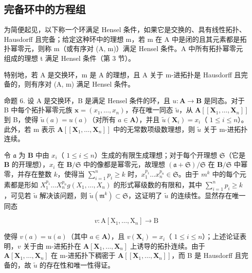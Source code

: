 \subsection{完备环中的方程组}

为简便起见，以下称一个环满足 Hensel 条件，如果它是交换的、具有线性拓扑、Hausdorff 且完备；给定这种环中的理想 m，若 m 在 A 中是闭的且其元素都是拓扑幂零元，则称 m（或有序对 (A, m)）满足 Hensel 条件。A 中所有拓扑幂零元组成的理想 t 满足 Hensel 条件（第 3 节）。

特别地，若 A 是交换环，m 是 A 的理想，且 A 关于 m-进拓扑是 Hausdorff 且完备的，则有序对 (A, m) 满足 Hensel 条件。

命题 6. 设 A 是交换环，B 是满足 Hensel 条件的环，且 \(u: \mathbf{A} \to \mathbf{B}\) 是同态。对于 B 中每个拓扑幂零元族 \(\mathbf{x} = (x_1, \ldots, x_n)\)，存在唯一同态 \(\tilde{u}\)，从 \(\mathbf{A}[[\mathbf{X}_1, \ldots, \mathbf{X}_n]]\) 到 B，使得 \(\tilde{u}(a) = u(a)\)（对所有 \(a \in \mathbf{A}\)），并且 \(\tilde{u}(\mathbf{X}_i) = x_i\)（ \(1 \leqslant i \leqslant n\)）。此外，若 m 表示 \(\mathbf{A}[[\mathbf{X}_1, \ldots, \mathbf{X}_n]]\) 中的无常数项级数理想，则 \(\tilde{u}\) 关于 m-进拓扑连续。

令 \(\mathfrak{a}\) 为 \(\mathbf{B}\) 中由 \(x_{i}\)（ \(1 \leqslant i \leqslant n\)）生成的有限生成理想；对于每个开理想 \(\mathfrak{S}\)（它是 \(\mathbf{B}\) 的开理想），\(x_{i}\) 在 \(\mathbf{B}/\mathfrak{S}\) 中的像都是幂零元，故理想 \((\mathfrak{a} + \mathfrak{S})/\mathfrak{S}\) 在 \(\mathbf{B}/\mathfrak{S}\) 中幂零，并存在整数 \(k\)，使得当 \(\sum_{i=1}^{n} p_{i} \geqslant k\) 时，\(x_{1}^{p_{1}} \ldots x_{n}^{p_{n}} \in \mathfrak{S}\)。由于 \(m^{k}\) 中的每个元素都是形如 \(X_{1}^{p_{1}} \ldots X_{n}^{p_{n}} g(X_{1}, \ldots, X_{n})\) 的形式幂级数的有限和，其中 \(\sum_{i=1}^{n} p_{i} \geqslant k\)，可见若 \(\tilde{u}\) 解决该问题，则 \(\tilde{u}(\mathfrak{m}^k) \subset \mathfrak{S}\)，这证明了 \(\tilde{u}\) 的连续性。显然存在唯一同态

\[
v \colon \mathrm{A} [ \mathrm{X} _ {1}, \dots , \mathrm{X} _ {n} ] \rightarrow \mathrm{B}
\]

使得 \(v(a) = u(a)\)（其中 \(a \in \mathbf{A}\)），且 \(v(\mathbf{X}_i) = x_i\)（ \(1 \leqslant i \leqslant n\)）；上述论证表明，\(v\) 关于由 m-进拓扑在 \(\mathbf{A}[\mathbf{X}_1, \ldots, \mathbf{X}_n]\) 上诱导的拓扑连续。由于 \(\mathbf{A}[\mathbf{X}_1, \ldots, \mathbf{X}_n]\) 在 m-进拓扑下稠密于 \(\mathbf{A}[[\mathbf{X}_1, \ldots, \mathbf{X}_n]]\)，而 B 是 Hausdorff 且完备的，故 \(\tilde{u}\) 的存在性和唯一性得证。

